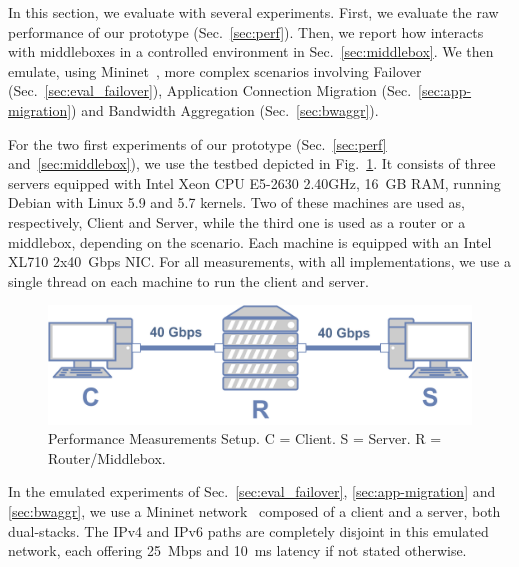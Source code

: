 
In this section, we evaluate \tcpls with several experiments. First, we evaluate the raw performance of our \tcpls prototype (Sec.~\ref{sec:perf}). Then, we report how \tcpls interacts with middleboxes in a controlled environment in  Sec.~\ref{sec:middlebox}. We then emulate, using Mininet~\cite{handigol2012reproducible}, more complex scenarios involving
Failover (Sec.~\ref{sec:eval_failover}), Application Connection Migration
(Sec.~\ref{sec:app-migration}) and Bandwidth Aggregation  (Sec.~\ref{sec:bwaggr}).

For the two first experiments of our \tcpls prototype (Sec.~\ref{sec:perf} and~\ref{sec:middlebox}), we use the testbed depicted in Fig.~\ref{fig:perf_testbed}. It consists of three servers equipped with Intel Xeon CPU E5-2630 2.40GHz, 16~GB RAM, running Debian with Linux 5.9 and 5.7 kernels. Two of these machines are used as, respectively, Client and Server, while the third one is used as a router or a middlebox, depending on the scenario. Each machine is equipped with an Intel XL710 2x40~Gbps NIC. For all measurements, with all implementations, we use a  single thread on each machine to run the client and server.

\begin{figure}[!t]
	\begin{center}
		\includegraphics[width=.6\columnwidth]{figures/testbed.png}
	\end{center}
	\caption{Performance Measurements Setup. C = Client. S = Server. R =
	Router/Middlebox.}
	\label{fig:perf_testbed}
\end{figure}

In the emulated experiments of Sec.~\ref{sec:eval_failover},
\ref{sec:app-migration} and \ref{sec:bwaggr}, we use a Mininet  network~\cite{handigol2012reproducible} composed of a client and a server, both
dual-stacks. The IPv4 and IPv6 paths are completely disjoint in this emulated
network, each offering 25~Mbps and 10~ms latency if not stated otherwise.





